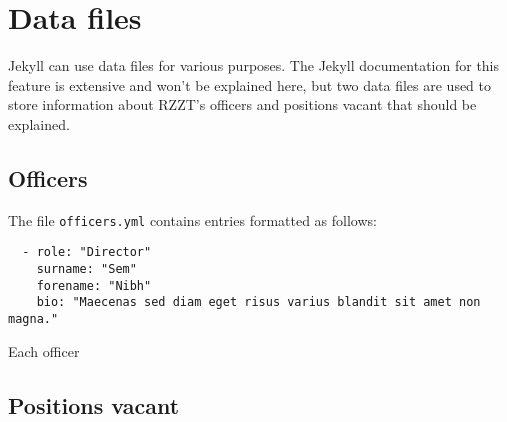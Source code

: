 \chapter{Data files}

Jekyll can use data files for various purposes. The Jekyll documentation for this feature is extensive and won't be explained here, but two data files are used to store information about RZZT's officers and positions vacant that should be explained.

\section{Officers}

The file \texttt{officers.yml} contains entries formatted as follows:

\begin{verbatim}
  - role: "Director"
    surname: "Sem"
    forename: "Nibh"
    bio: "Maecenas sed diam eget risus varius blandit sit amet non magna."
\end{verbatim}

Each officer

\section{Positions vacant}
